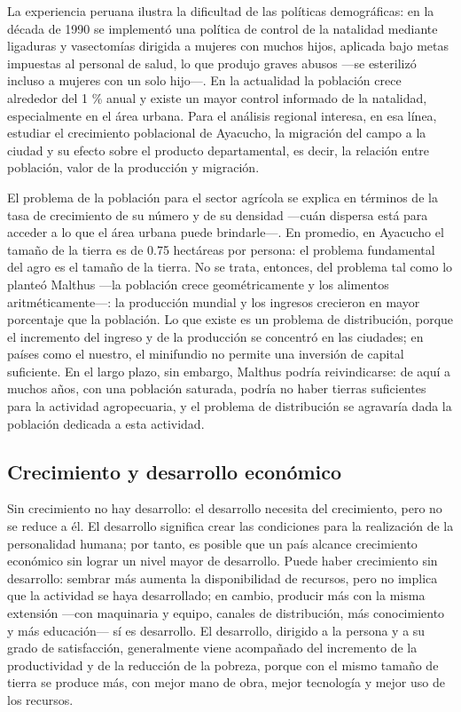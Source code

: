 \documentclass[
  man,
  floatsintext,
  longtable,
  a4paper,
  nolmodern,
  notxfonts,
  notimes,
  12pt,
  colorlinks=true,linkcolor=blue,citecolor=blue,urlcolor=blue]{apa7}
\begin{document}
La experiencia peruana ilustra la dificultad de las políticas
demográficas: en la década de 1990 se implementó una política de control
de la natalidad mediante ligaduras y vasectomías dirigida a mujeres con
muchos hijos, aplicada bajo metas impuestas al personal de salud, lo que
produjo graves abusos ---se esterilizó incluso a mujeres con un solo
hijo---. En la actualidad la población crece alrededor del 1 \% anual y
existe un mayor control informado de la natalidad, especialmente en el
área urbana. Para el análisis regional interesa, en esa línea, estudiar
el crecimiento poblacional de Ayacucho, la migración del campo a la
ciudad y su efecto sobre el producto departamental, es decir, la
relación entre población, valor de la producción y migración.

El problema de la población para el sector agrícola se explica en
términos de la tasa de crecimiento de su número y de su densidad ---cuán
dispersa está para acceder a lo que el área urbana puede brindarle---.
En promedio, en Ayacucho el tamaño de la tierra es de 0.75 hectáreas por
persona: el problema fundamental del agro es el tamaño de la tierra. No
se trata, entonces, del problema tal como lo planteó Malthus ---la
población crece geométricamente y los alimentos aritméticamente---: la
producción mundial y los ingresos crecieron en mayor porcentaje que la
población. Lo que existe es un problema de distribución, porque el
incremento del ingreso y de la producción se concentró en las ciudades;
en países como el nuestro, el minifundio no permite una inversión de
capital suficiente. En el largo plazo, sin embargo, Malthus podría
reivindicarse: de aquí a muchos años, con una población saturada, podría
no haber tierras suficientes para la actividad agropecuaria, y el
problema de distribución se agravaría dada la población dedicada a esta
actividad.

\subsection{Crecimiento y desarrollo
económico}\label{crecimiento-y-desarrollo-econuxf3mico}

Sin crecimiento no hay desarrollo: el desarrollo necesita del
crecimiento, pero no se reduce a él. El desarrollo significa crear las
condiciones para la realización de la personalidad humana; por tanto, es
posible que un país alcance crecimiento económico sin lograr un nivel
mayor de desarrollo. Puede haber crecimiento sin desarrollo: sembrar más
aumenta la disponibilidad de recursos, pero no implica que la actividad
se haya desarrollado; en cambio, producir más con la misma extensión
---con maquinaria y equipo, canales de distribución, más conocimiento y
más educación--- sí es desarrollo. El desarrollo, dirigido a la persona
y a su grado de satisfacción, generalmente viene acompañado del
incremento de la productividad y de la reducción de la pobreza, porque
con el mismo tamaño de tierra se produce más, con mejor mano de obra,
mejor tecnología y mejor uso de los recursos.
\end{document}
